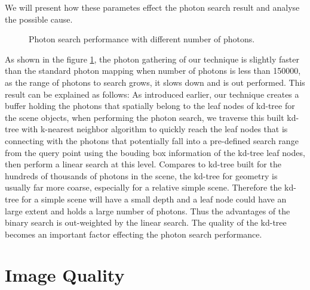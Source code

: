 We will present how these parametes effect the photon search result and analyse the possible cause. 

\begin{figure}[ftp] 
    \centering 
    \renewcommand{\thefigure}{\thechapter.\arabic{figure}}
    \caption[]{Photon search performance with different number of photons. }
    \label{fig:photon_search_1}  
\end{figure} 

As shown in the figure \ref{fig:photon_search_1}, the photon gathering of our technique is slightly faster than the standard photon mapping when number of photons is less than 150000, as the range of photons to search grows, it slows down and is out performed. This result can be explained as follows: As introduced earlier, our technique creates a buffer holding the photons that spatially belong to the leaf nodes of kd-tree for the scene objects, when performing the photon search, we traverse this built kd-tree with k-nearest neighbor algorithm to quickly reach the leaf nodes that is connecting with the photons that potentially fall into a pre-defined search range from the query point using the bouding box information of the kd-tree leaf nodes, then perform a linear search at this level. Compares to kd-tree built for the hundreds of thousands of photons in the scene, the kd-tree for geometry is usually far more coarse, especially for a relative simple scene. Therefore the kd-tree for a simple scene will have a small depth and a leaf node could have an large extent and holds a large number of photons. Thus the advantages of the binary search is out-weighted by the linear search. The quality of the kd-tree becomes an important factor effecting the photon search performance. 






\section{Image Quality}

